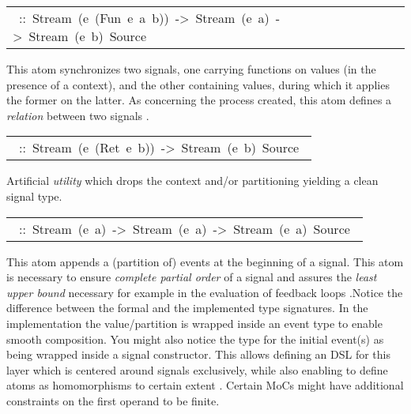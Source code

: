 \begin{haddockdesc}
\begin{haddockdesc}
\item[\begin{tabular}{@{}l}\haddockid{(-*-)}\ ::\ Stream\ (e\ (Fun\ e\ a\ b))\ ->\ Stream\ (e\ a)\ ->\ Stream\ (e\ b)\ Source\ \end{tabular}]
\haddockbegindoc
This atom synchronizes two signals, one carrying functions on values (in the presence of a context), and the other containing values, during which it applies the former on the latter. As concerning the process created, this atom defines a \emph{relation} between two signals  \cite{Lee98}.\par

\item[\begin{tabular}{@{}l}\haddockid{(-*)}\ ::\ Stream\ (e\ (Ret\ e\ b))\ ->\ Stream\ (e\ b)\ Source\ \end{tabular}]
\haddockbegindoc
Artificial \emph{utility} which drops the context and/or partitioning yielding a clean signal type.\par

\item[\begin{tabular}{@{}l}\haddockid{(-<-)}\ ::\ Stream\ (e\ a)\ ->\ Stream\ (e\ a)\ ->\ Stream\ (e\ a)\ Source\ \end{tabular}]
\haddockbegindoc
This atom appends a (partition of) events at the beginning of a signal. This atom is necessary to ensure \emph{complete partial order} of a signal and assures the \emph{least upper bound} necessary for example in the evaluation of feedback loops  \cite{Lee98}.Notice the difference between the formal and the implemented type signatures. In the implementation the value/partition is wrapped inside an event type to enable smooth composition. You might also notice the type for the initial event(s) as being wrapped inside a signal constructor. This allows defining an DSL for this layer which is centered around signals exclusively, while also enabling to define atoms as homomorphisms to certain extent  \cite{Bird97}. Certain MoCs might have additional constraints on the first operand to be finite.\par


\end{haddockdesc}
\end{haddockdesc}
